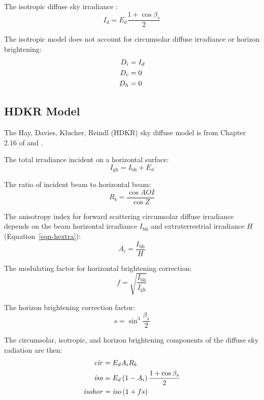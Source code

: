 \documentclass[12pt,letterpaper]{article}
\newcommand\AOI{\ensuremath{\mathit{AOI}}}
\begin{document}
The isotropic diffuse sky irradiance \citep{liu1963}:
\begin{equation}
I_d = E_d\frac{1 + \cos\beta_s}{2}
\end{equation}

The isotropic model does not account for circumsolar diffuse irradiance or horizon brightening:
\begin{align}
D_i &= I_d \notag\\
D_c &= 0 \notag\\
D_h &= 0
\end{align}

\subsection{HDKR Model}\label{sec-hdkr}

The Hay, Davies, Klucher, Reindl (HDKR) sky diffuse model is from Chapter 2.16 of \citet{duffie2013} and \citet{reindl1988}.

The total irradiance incident on a horizontal surface:
\begin{equation}
I_{\mathrm{gh}} = I_{\mathrm{bh}} + E_d
\end{equation}

The ratio of incident beam to horizontal beam:
\begin{equation}
R_b = \frac{\cos\AOI}{\cos Z}
\end{equation}

The anisotropy index for forward scattering circumsolar diffuse irradiance depends on the beam horizontal irradiance $I_{\mathrm{bh}}$ and extraterrestrial irradiance $H$ (Equation~\ref{eqn-hextra}):
\begin{equation}
A_i = \frac{I_{\mathrm{bh}}}{H}
\end{equation}

The modulating factor for horizontal brightening correction:
\begin{equation}
f =\sqrt{\frac{I_{\mathrm{bh}}}{I_{\mathrm{gh}}}}
\end{equation}

The horizon brightening correction factor:
\begin{equation}
s =\sin^3\frac{\beta_s}{2}
\end{equation}

The circumsolar, isotropic, and horizon brightening components of the diffuse sky radiation are then:
\begin{align}
\mathit{cir} &= E_d A_i R_b \notag\\
\mathit{iso} &= E_d \left( 1 - A_i \right) \frac{1 + \cos \beta_s}{2} \notag\\
\mathit{isohor} &= \mathit{iso} \left( 1 + f s \right)
\end{align}
\end{document}
